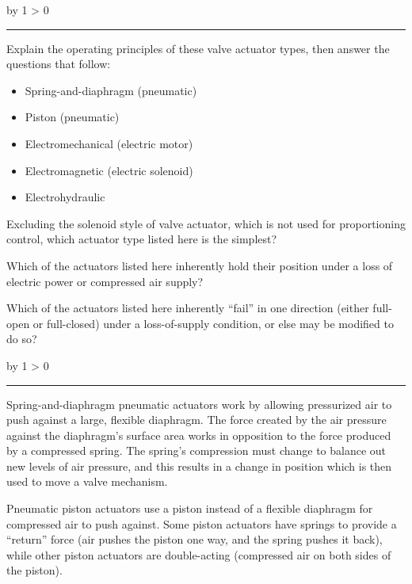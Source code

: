 \documentclass[12pt,a4paper]{article}
\def\oppgave{
            \advance\questnum by 1
            \ifnum \questnum > 0
                 \hrule
                 \vskip 3pt
                 \leftline{Oppgave \the\questnum}
                 \vskip 3pt \fi}
\def\svar{
           \advance\answnum by 1
           \ifnum \answnum > 0
                \hrule
                \vskip 3pt
                \leftline{Svar \the\answnum}
                \vskip 3pt \fi}
\begin{document}
\vfil \eject 



\oppgave{} 

Explain the operating principles of these valve actuator types, then answer the questions that follow:

\begin{itemize}
\item{}Spring-and-diaphragm (pneumatic)
\item{}Piston (pneumatic)
\item{}Electromechanical (electric motor)
\item{}Electromagnetic (electric solenoid)
\item{}Electrohydraulic
\end{itemize}

\vskip 10pt

Excluding the solenoid style of valve actuator, which is not used for proportioning control, which actuator type listed here is the simplest?

\vskip 10pt

Which of the actuators listed here inherently hold their position under a loss of electric power or compressed air supply?

\vskip 10pt

Which of the actuators listed here inherently ``fail'' in one direction (either full-open or full-closed) under a loss-of-supply condition, or else may be modified to do so?

\vskip 10pt \filbreak 





\svar{} 

Spring-and-diaphragm pneumatic actuators work by allowing pressurized air to push against a large, flexible diaphragm.  The force created by the air pressure against the diaphragm's surface area works in opposition to the force produced by a compressed spring.  The spring's compression must change to balance out new levels of air pressure, and this results in a change in position which is then used to move a valve mechanism.

\vskip 10pt

Pneumatic piston actuators use a piston instead of a flexible diaphragm for compressed air to push against.  Some piston actuators have springs to provide a ``return'' force (air pushes the piston one way, and the spring pushes it back), while other piston actuators are double-acting (compressed air on both sides of the piston).
\end{document}
